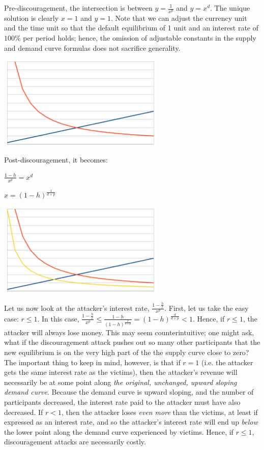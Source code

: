\documentclass[12pt]{article}
\begin{document}
Pre-discouragement, the intersection is between $y = \frac{1}{x^p}$ and $y = x^d$. The unique solution is clearly $x=1$ and $y=1$. Note that we can adjust the currency unit and the time unit so that the default equilibrium of 1 unit and an interest rate of $100\%$ per period holds; hence, the omission of adjustable constants in the supply and demand curve formulas does not sacrifice generality.

\includegraphics[width=300px]{disc_chart1.png}

Post-discouragement, it becomes:

$\frac{1-h}{x^p} = x^d$

$x=(1-h)^{\frac{1}{d+p}}$

\includegraphics[width=300px]{disc_chart2.png}

Let us now look at the attacker's interest rate, $\frac{1-\frac{h}{r}}{x^p}$. First, let us take the easy case: $r \le 1$. In this case, $\frac{1-\frac{h}{r}}{x^p} \le \frac{1-h}{(1-h)^{\frac{p}{d+p}}} = (1-h)^{\frac{d}{d+p}} < 1$. Hence, if $r \le 1$, the attacker will always lose money. This may seem counterintuitive; one might ask, what if the discouragement attack pushes out so many other participants that the new equilibrium is on the very high part of the the supply curve close to zero? The important thing to keep in mind, however, is that if $r = 1$ (i.e. the attacker gets the same interest rate as the victims), then the attacker's revenue will necessarily be at some point along \textit{the original, unchanged, upward sloping demand curve}. Because the demand curve is upward sloping, and the number of participants decreased, the interest rate paid to the attacker must have also decreased. If $r < 1$, then the attacker loses \textit{even more} than the victims, at least if expressed as an interest rate, and so the attacker's interest rate will end up \textit{below} the lower point along the demand curve experienced by victims. Hence, if $r \le 1$, discouragement attacks are necessarily costly.
\end{document}
